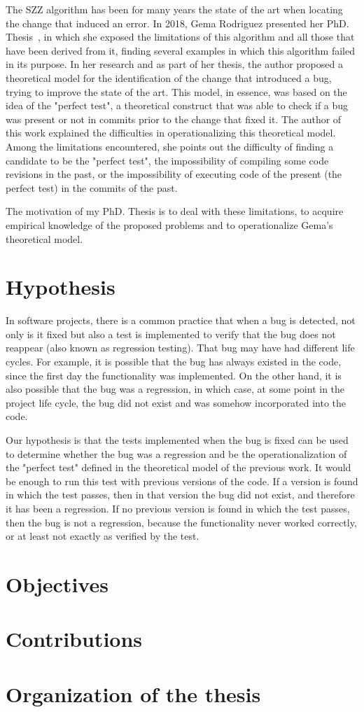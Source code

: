 The SZZ algorithm has been for many years the state of the art when locating the change that induced an error. 
In 2018, Gema Rodriguez presented her PhD. Thesis~\cite{rodriguez2018towards}, in which she exposed the limitations of this algorithm and all those that have been derived from it, finding several examples in which this algorithm failed in its purpose. 
In her research and as part of her thesis, the author proposed a theoretical model for the identification of the change that introduced a bug, trying to improve the state of the art. 
This model, in essence, was based on the idea of the "perfect test", a theoretical construct that was able to check if a bug was present or not in commits prior to the change that fixed it. The author of this work explained the difficulties in operationalizing this theoretical model. 
Among the limitations encountered, she points out the difficulty of finding a candidate to be the "perfect test", the impossibility of compiling some code revisions in the past, or the impossibility of executing code of the present (the perfect test) in the commits of the past.

The motivation of my PhD. Thesis is to deal with these limitations, to acquire empirical knowledge of the proposed problems and to operationalize Gema's theoretical model.

\section{Hypothesis}

In software projects, there is a common practice that when a bug is detected, not only is it fixed but also a test is implemented to verify that the bug does not reappear (also known as regression testing). 
That bug may have had different life cycles. 
For example, it is possible that the bug has always existed in the code, since the first day the functionality was implemented. 
On the other hand, it is also possible that the bug was a regression, in which case, at some point in the project life cycle, the bug did not exist and was somehow incorporated into the code. 

Our hypothesis is that the tests implemented when the bug is fixed can be used to determine whether the bug was a regression and be the operationalization of the "perfect test" defined in the theoretical model of the previous work. 
It would be enough to run this test with previous versions of the code. 
If a version is found in which the test passes, then in that version the bug did not exist, and therefore it has been a regression. 
If no previous version is found in which the test passes, then the bug is not a regression, because the functionality never worked correctly, or at least not exactly as verified by the test.

\section{Objectives}

\section{Contributions}

\section{Organization of the thesis}